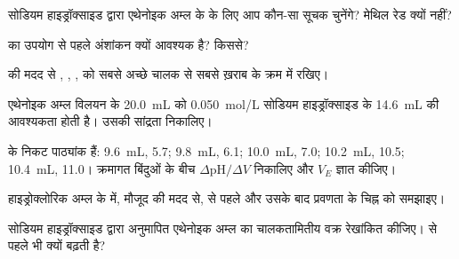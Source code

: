 \begin{exercise}[$\star$]\label{exo:g12:ph-conductivity-titrations:3}
सोडियम हाइड्रॉक्साइड द्वारा एथेनोइक अम्ल के  के लिए आप कौन-सा सूचक
चुनेंगे? मेथिल रेड क्यों नहीं?
\end{exercise}

\begin{exercise}[$\star$]\label{exo:g12:ph-conductivity-titrations:4}
 का उपयोग से पहले अंशांकन क्यों आवश्यक है? किससे?
\end{exercise}

\begin{exercise}[$\star$]\label{exo:g12:ph-conductivity-titrations:5}
 की मदद से  , ,
,  को सबसे अच्छे चालक से सबसे ख़राब के क्रम में रखिए।
\end{exercise}

\begin{exercise}[$\star\star$]\label{exo:g12:ph-conductivity-titrations:6}
एथेनोइक अम्ल विलयन के \qty{20.0}{mL} को \qty{0.050}{mol/L} सोडियम हाइड्रॉक्साइड के
\qty{14.6}{mL} की आवश्यकता होती है। उसकी सांद्रता निकालिए।
\end{exercise}

\begin{exercise}[$\star\star$]\label{exo:g12:ph-conductivity-titrations:7}
 के निकट पाठ्यांक हैं: \qty{9.6}{mL},  5.7;
\qty{9.8}{mL}, 6.1; \qty{10.0}{mL}, 7.0; \qty{10.2}{mL}, 10.5;
\qty{10.4}{mL}, 11.0। क्रमागत बिंदुओं के बीच $\Delta\mathrm{pH}/\Delta V$
निकालिए और $V_E$ ज्ञात कीजिए।
\end{exercise}

\begin{exercise}[$\star\star$]\label{exo:g12:ph-conductivity-titrations:8}
हाइड्रोक्लोरिक अम्ल के  में, मौजूद  की मदद से,  से पहले और
उसके बाद प्रवणता के चिह्न को समझाइए।
\end{exercise}

\begin{exercise}[$\star\star$]\label{exo:g12:ph-conductivity-titrations:9}
सोडियम हाइड्रॉक्साइड द्वारा अनुमापित एथेनोइक अम्ल का चालकतामितीय वक्र रेखांकित कीजिए।
 से पहले भी  क्यों बढ़ती है?
\end{exercise}

